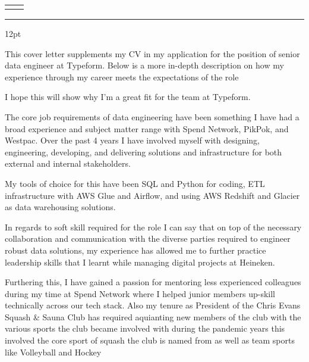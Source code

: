 \documentclass[10pt,A4]{article}
\newcommand{\cvevent} [3]
    {
    
    \begin{tabular*}{1\textwidth}{p{13.6cm}  x{3.9cm}}
    	\text{#2} \textcolor{sectcol}{#1} &   \vspace{2.5pt}\textcolor{sectcol}{#1}
    \end{tabular*}
    
    \vspace{-8pt}
    \textcolor{ubersoftcol}{\hrule}
    	
    \vspace{3pt}
    }
\begin{document}
    
    
    
        \cvevent{}{\textit{To Whom It May Concern}}
        
        \vspace{12pt}


    This cover letter supplements my CV in my application for the position of senior data engineer at Typeform. 
    Below is a more in-depth description on how my experience through my career meets the expectations of the role
    \par \vspace{4pt}
    I hope this will show why I'm a great fit for the team at 
    Typeform.
    \par \vspace{12pt}
    The core job requirements of data engineering have been something I have had a broad experience and subject matter range with Spend Network, PikPok, and Westpac. Over the past 4 years I have involved myself with designing, engineering, developing, and delivering solutions and infrastructure for both external and internal stakeholders. 
    \par \vspace{4pt}
    My tools of choice for this have been SQL and Python for coding, ETL infrastructure with AWS Glue and Airflow, and using AWS Redshift and Glacier as data warehousing solutions.
    \par \vspace{8pt}
    In regards to soft skill required for the role I can say that on top of the necessary collaboration and communication with the diverse parties required to engineer robust data solutions, my experience has allowed me to further practice leadership skills that I learnt while managing digital projects at Heineken.
    \par \vspace{8pt}
    Furthering this, I have gained a passion for mentoring less experienced colleagues during my time at Spend Network where I helped junior members up-skill technically across our tech stack. Also my tenure as President of the Chris Evans Squash \& Sauna Club has required aquianting new members of the club with the various sports the club became involved with during the pandemic years this involved the core sport of squash the club is named from as well as team sports like Volleyball and Hockey
\end{document}
